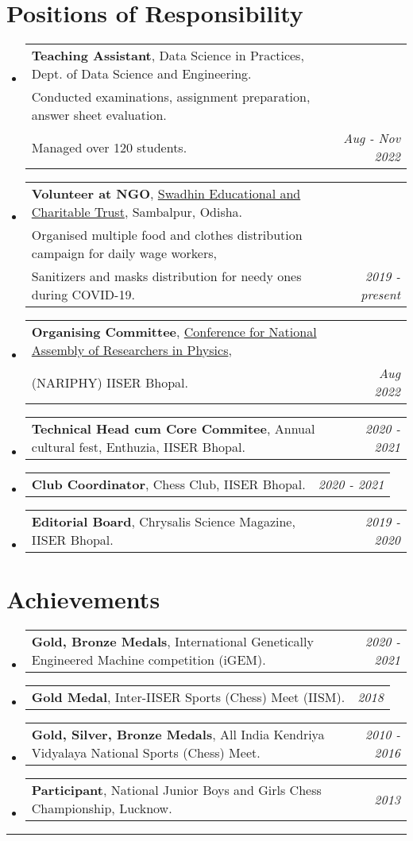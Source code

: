 \documentclass[a4paper,11pt]{article}
\makeatletter
\newcommand{\resumePOR}[3]{
\vspace{0.5mm}\item
    \begin{tabular*}{0.97\textwidth}[t]{l@{\extracolsep{\fill}}r}
        \textbf{#1}, \hspace{0.3mm}#2 & \textit{\small{#3}} 
    \end{tabular*}
    \vspace{-2mm}
}
\newcommand{\resumeSubHeadingListStart}{\begin{itemize}[leftmargin=*,labelsep=0mm]}
\newcommand{\resumeSubHeadingListEnd}{\end{itemize}\vspace{2mm}}
\makeatother
\begin{document}
\section{Positions of Responsibility}
\vspace{-0.4mm}
\resumeSubHeadingListStart
\resumePOR{Teaching Assistant} %
    {Data Science in Practices, Dept. of Data Science and Engineering. \\
    Conducted examinations, assignment preparation, answer sheet evaluation. \\ Managed over 120 students.} %
    {Aug - Nov 2022} %
\resumePOR{Volunteer at NGO} %
    {\href{https://www.facebook.com/Swadhin.SRR/}{Swadhin Educational and Charitable Trust}, Sambalpur, Odisha. \\
    Organised multiple food and clothes distribution campaign for daily wage workers,\\
    Sanitizers and masks distribution for needy ones during COVID-19.} %
    {2019 - present} %
\resumePOR{Organising Committee} %
    {\href {https://sites.google.com/iiserb.ac.in/nariphy/home}{Conference for National Assembly of Researchers in Physics}, \\(NARIPHY) IISER Bhopal.} %
    {Aug 2022} %
\resumePOR{Technical Head cum Core Commitee} %
    {Annual cultural fest, Enthuzia, IISER Bhopal.} %
    {2020 - 2021} %
\resumePOR{Club Coordinator} %
    {Chess Club, IISER Bhopal.} %
    {2020 - 2021} %
\resumePOR{Editorial Board} %
    {Chrysalis Science Magazine, IISER Bhopal.} %
    {2019 - 2020} %
\resumeSubHeadingListEnd
\vspace{-4mm}


\section{Achievements}
\vspace{-0.2mm}
\resumeSubHeadingListStart
\resumePOR{Gold, Bronze Medals} %
    {International Genetically Engineered Machine competition (iGEM).} %
    {2020 - 2021} %

\resumePOR{Gold Medal} %
    {Inter-IISER Sports (Chess) Meet (IISM).} %
    {2018} %

\resumePOR{Gold, Silver, Bronze Medals} %
    {All India Kendriya Vidyalaya National Sports (Chess) Meet.} %
    {2010 - 2016} %

\resumePOR{Participant} %
    {National Junior Boys and Girls Chess Championship, Lucknow.} %
    {2013} %

\resumeSubHeadingListEnd
\hspace*{-5mm}\rule{1.035\textwidth}{0.1mm}

\end{document}
